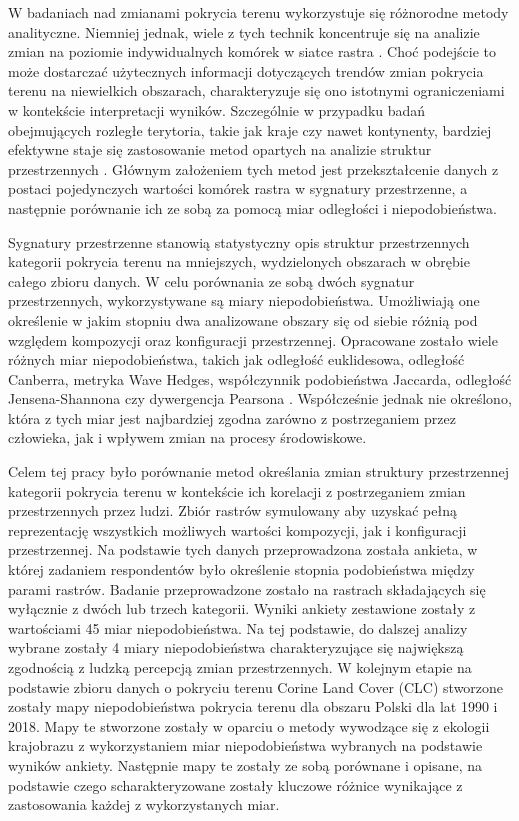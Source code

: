 \documentclass{amuthesis}
\begin{document}
W badaniach nad zmianami pokrycia terenu wykorzystuje się różnorodne
metody analityczne. Niemniej jednak, wiele z tych technik koncentruje
się na analizie zmian na poziomie indywidualnych komórek w siatce rastra
\autocite{ChangeDetectionTechniques}. Choć podejście to może dostarczać
użytecznych informacji dotyczących trendów zmian pokrycia terenu na
niewielkich obszarach, charakteryzuje się ono istotnymi ograniczeniami w
kontekście interpretacji wyników. Szczególnie w przypadku badań
obejmujących rozległe terytoria, takie jak kraje czy nawet kontynenty,
bardziej efektywne staje się zastosowanie metod opartych na analizie
struktur przestrzennych \autocite{Netzel2015}. Głównym założeniem tych
metod jest przekształcenie danych z postaci pojedynczych wartości
komórek rastra w sygnatury przestrzenne, a następnie porównanie ich ze
sobą za pomocą miar odległości i niepodobieństwa.

Sygnatury przestrzenne stanowią statystyczny opis struktur
przestrzennych kategorii pokrycia terenu na mniejszych, wydzielonych
obszarach w obrębie całego zbioru danych. W celu porównania ze sobą
dwóch sygnatur przestrzennych, wykorzystywane są miary niepodobieństwa.
Umożliwiają one określenie w jakim stopniu dwa analizowane obszary się
od siebie różnią pod względem kompozycji oraz konfiguracji
przestrzennej. Opracowane zostało wiele różnych miar niepodobieństwa,
takich jak odległość euklidesowa, odległość Canberra, metryka Wave
Hedges, współczynnik podobieństwa Jaccarda, odległość Jensena-Shannona
czy dywergencja Pearsona \autocite{Cha2007}. Współcześnie jednak nie
określono, która z tych miar jest najbardziej zgodna zarówno z
postrzeganiem przez człowieka, jak i wpływem zmian na procesy
środowiskowe.

Celem tej pracy było porównanie metod określania zmian struktury
przestrzennej kategorii pokrycia terenu w kontekście ich korelacji z
postrzeganiem zmian przestrzennych przez ludzi. Zbiór rastrów symulowany
aby uzyskać pełną reprezentację wszystkich możliwych wartości
kompozycji, jak i konfiguracji przestrzennej. Na podstawie tych danych
przeprowadzona została ankieta, w której zadaniem respondentów było
określenie stopnia podobieństwa między parami rastrów. Badanie
przeprowadzone zostało na rastrach składających się wyłącznie z dwóch
lub trzech kategorii. Wyniki ankiety zestawione zostały z wartościami 45
miar niepodobieństwa. Na tej podstawie, do dalszej analizy wybrane
zostały 4 miary niepodobieństwa charakteryzujące się największą
zgodnością z ludzką percepcją zmian przestrzennych. W kolejnym etapie na
podstawie zbioru danych o pokryciu terenu Corine Land Cover (CLC)
stworzone zostały mapy niepodobieństwa pokrycia terenu dla obszaru
Polski dla lat 1990 i 2018. Mapy te stworzone zostały w oparciu o metody
wywodzące się z ekologii krajobrazu z wykorzystaniem miar
niepodobieństwa wybranych na podstawie wyników ankiety. Następnie mapy
te zostały ze sobą porównane i opisane, na podstawie czego
scharakteryzowane zostały kluczowe różnice wynikające z zastosowania
każdej z wykorzystanych miar.
\end{document}
